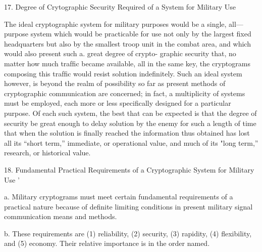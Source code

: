 17. Degree of Crytographic Security Required of a System for
Military Use

The ideal cryptographic system for military purposes would be a
single, all—purpose system which would be practicable for use not only by
the largest ﬁxed headquarters but also by the smallest troop unit in the
combat area, and which would also present such a. great degree of crypto-
graphic security that, no matter how much trafﬁc became available, all
in the same key, the cryptograms composing this trafﬁc would resist
solution indeﬁnitely. Such an ideal system however, is beyond the realm
of possibility so far as present methods of cryptographic communication
are concerned; in fact, a multiplicity of systems must be employed, each
more or less speciﬁcally designed for a particular purpose. Of each such
system, the best that can be expected is that the degree of security be
great enough to delay solution by the enemy for such a length of time
that when the solution is ﬁnally reached the information thus obtained
has lost all its “short term,” immediate, or operational value, and much
of its "long term,” research, or historical value.

18. Fundamental Practical Requirements of a Cryptographic
System for Military Use '

a. Military cryptograms must meet certain fundamental requirements
of a practical nature because of deﬁnite limiting conditions in present
military signal communication means and methods.

b. These requirements are (1) reliability, (2) security, (3) rapidity,
(4) ﬂexibility, and (5) economy. Their relative importance is in the
order named.

